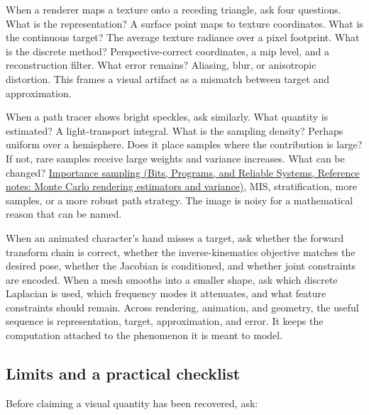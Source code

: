 When a renderer maps a texture onto a receding triangle, ask four questions. What is the representation? A surface point maps to texture coordinates. What is the continuous target? The average texture radiance over a pixel footprint. What is the discrete method? Perspective-correct coordinates, a mip level, and a reconstruction filter. What error remains? Aliasing, blur, or anisotropic distortion. This frames a visual artifact as a mismatch between target and approximation.

When a path tracer shows bright speckles, ask similarly. What quantity is estimated? A light-transport integral. What is the sampling density? Perhaps uniform over a hemisphere. Does it place samples where the contribution is large? If not, rare samples receive large weights and variance increases. What can be changed? \href{../01-Bits-Programs-and-Reliable-Systems/main.pdf\#nameddest=appendix-031e02bf28af}{Importance sampling (Bits, Programs, and Reliable Systems, Reference notes: Monte Carlo rendering estimators and variance)}, MIS, stratification, more samples, or a more robust path strategy. The image is noisy for a mathematical reason that can be named.

When an animated character's hand misses a target, ask whether the forward transform chain is correct, whether the inverse-kinematics objective matches the desired pose, whether the Jacobian is conditioned, and whether joint constraints are encoded. When a mesh smooths into a smaller shape, ask which discrete Laplacian is used, which frequency modes it attenuates, and what feature constraints should remain. Across rendering, animation, and geometry, the useful sequence is representation, target, approximation, and error. It keeps the computation attached to the phenomenon it is meant to model.

\subsection{Limits and a practical checklist}\label{04-visual-computing-ii-ch034-limits-and-a-practical-checklist}

Before claiming a visual quantity has been recovered, ask:

